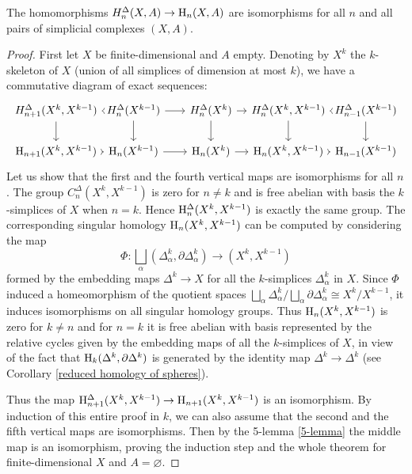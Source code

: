 \begin{thm}
    The homomorphisms $H^\Delta_n(X,A)\to \mathrm{H}_n(X,A)$ are isomorphisms for all $n$ and all pairs of simplicial complexes $(X,A)$.
\end{thm}
\begin{proof}
     First let $X$ be finite-dimensional and $A$ empty. Denoting by $X^k$ the $k$-skeleton of $X$ (union of all simplices of dimension at most $k$), we have a commutative diagram of exact sequences:
     \[\begin{tikzcd}[column sep={70, between origins}]
        H^\Delta_{n+1}(X^k,X^{k-1})\arrow[r]\arrow[d] & H^\Delta_{n}(X^{k-1})\arrow[r]\arrow[d] & H^\Delta_{n}(X^k) \arrow[r]\arrow[d] & H^\Delta_{n}(X^k,X^{k-1})\arrow[d]\arrow[r] & H^\Delta_{n-1}(X^{k-1})\arrow[d] \\
       \rmH_{n+1}(X^k,X^{k-1})\arrow[r] & \rmH_{n}(X^{k-1})\arrow[r] & \rmH_n(X^k)\arrow[r] &\rmH_n(X^k,X^{k-1}) \arrow[r] &\rmH_{n-1}(X^{k-1}) 
    \end{tikzcd}\]
    Let us show that the first and the fourth vertical maps are isomorphisms for all $n$. The group $C_n^\Delta(X^k,X^{k-1})$ is zero for $n\neq k$ and is free abelian with basis the $k$-simplices of $X$ when $n=k$. Hence $\mathrm{H}_n^\Delta(X^k,X^{k-1})$ is exactly the same group. The corresponding singular homology $\mathrm{H}_n(X^k,X^{k-1})$ can be computed by considering the map
    \[\Phi:\bigsqcup_\alpha (\Delta_\alpha^k,\partial\Delta_\alpha^k)\to (X^k,X^{k-1})\]
    formed by the embedding maps $\Delta^k\to X$ for all the $k$-simplices $\Delta_\alpha^k$ in $X$. Since $\Phi$ induced a homeomorphism of the quotient spaces $\bigsqcup_\alpha \Delta^k_\alpha/\bigsqcup_\alpha \partial\Delta_\alpha^k\cong X^k/X^{k-1}$, it induces isomorphisms on all singular homology groups. Thus $\mathrm{H}_n(X^k,X^{k-1})$ is zero for $k\neq n$ and for $n=k$ it is free abelian with basis represented by the relative cycles given by the embedding maps of all the $k$-simplices of $X$, in view of the fact that $\mathrm{H}_k(\Delta^k,\partial\Delta^k)$ is generated by the identity map $\Delta^k\to \Delta^k$ (see Corollary \ref{reduced homology of spheres}).
    
    Thus the map $ \mathrm{H}_{n+1}^\Delta(X^k,X^{k-1})\to  \mathrm{H}_{n+1}(X^k,X^{k-1})$ is an isomorphism. By induction of this entire proof in $k$, we can also assume that the second and the fifth vertical maps are isomorphisms. Then by the 5-lemma \ref{5-lemma} the middle map is an isomorphism, proving the induction step and the whole theorem for finite-dimensional $X$ and $A=\varnothing$.
    

\end{proof}
